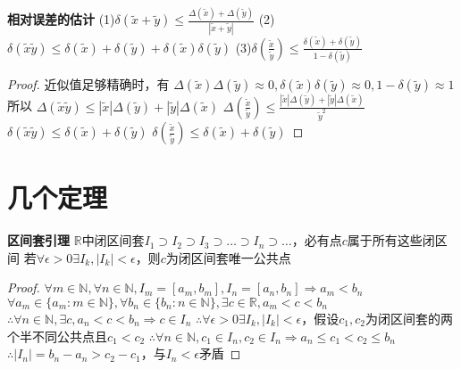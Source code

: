 \documentclass[11pt]{article}
\begin{document}
\textbf{相对误差的估计} \newline
(1)$\delta(\tilde{x}+\tilde{y}) \le \frac{\Delta(\tilde{x})+\Delta(\tilde{y})}{|\tilde{x}+\tilde{y}|}$ \newline
(2)$\delta(\tilde{x}\tilde{y}) \le \delta(\tilde{x})+\delta(\tilde{y})+\delta(\tilde{x})\delta(\tilde{y})$ \newline
(3)$\delta(\frac{\tilde{x}}{\tilde{y}}) \le \frac{\delta(\tilde{x})+\delta(\tilde{y})}{1-\delta(\tilde{y})}$ \newline
\begin{proof}
  近似值足够精确时，有 \newline
  $\Delta(\tilde{x})\Delta(\tilde{y})\approx 0, \delta(\tilde{x})\delta(\tilde{y})\approx 0, 1-\delta(\tilde{y})\approx 1$ \newline
  所以 \newline
  $\Delta(\tilde{x}\tilde{y}) \le |\tilde{x}|\Delta(\tilde{y})+|\tilde{y}|\Delta(\tilde{x})$ \newline
  $\Delta(\frac{\tilde{x}}{\tilde{y}}) \le \frac{|\tilde{x}|\Delta(\tilde{y})+ |\tilde{y}|\Delta(\tilde{x})}{\tilde{y}^2}$ \newline
  $\delta(\tilde{x}\tilde{y}) \le \delta(\tilde{x})+\delta(\tilde{y})$ \newline
  $\delta(\frac{\tilde{x}}{\tilde{y}}) \le \delta(\tilde{x})+\delta(\tilde{y})$ \newline
\end{proof}

\section{几个定理}
\textbf{区间套引理} \newline
$\mathbb{R}$中闭区间套$I_1\supset I_2\supset I_3\supset\dots\supset I_n\supset\dots$，必有点$c$属于所有这些闭区间 \newline
若$\forall\epsilon>0 \exists I_k, |I_k|<\epsilon$，则$c$为闭区间套唯一公共点 \newline
\begin{proof}
  $\forall m \in\mathbb{N}, \forall n\in\mathbb{N}, I_m=[a_m,b_m],I_n=[a_n,b_n] \Rightarrow a_m<b_n$ \newline
  $\forall a_m\in\{a_m:m\in\mathbb{N}\}, \forall b_n\in\{b_n:n\in\mathbb{N}\}, \exists c\in\mathbb{R}, a_m<c<b_n$ \newline
  $\therefore \forall n\in\mathbb{N}, \exists c, a_n<c<b_n \Rightarrow c\in I_n$ \newline
  $\therefore \forall\epsilon>0 \exists I_k, |I_k|<\epsilon$，假设$c_1,c_2$为闭区间套的两个半不同公共点且$c_1<c_2$ \newline
  $\therefore \forall n\in\mathbb{N}, c_1\in I_n, c_2\in I_n \Rightarrow a_n\le c_1<c_2\le b_n$ \newline
  $\therefore |I_n|=b_n-a_n>c_2-c_1$，与$I_n<\epsilon$矛盾
\end{proof}
\end{document}
